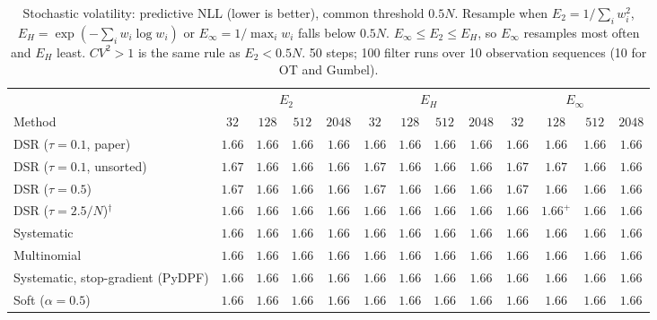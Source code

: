 \begin{table}[ht]
\centering
\small
\caption{Stochastic volatility: predictive NLL (lower is better), common threshold $0.5N$. Resample when $E_2=1/\sum_iw_i^2$, $E_H=\exp(-\sum_iw_i\log w_i)$ or $E_\infty=1/\max_iw_i$ falls below $0.5N$. $E_\infty\le E_2\le E_H$, so $E_\infty$ resamples most often and $E_H$ least. $CV^2>1$ is the same rule as $E_2<0.5N$. 50 steps; 100 filter runs over 10 observation sequences (10 for OT and Gumbel).}
\label{tab:trigger-fixed-volatility-predictive_nll}
\begin{adjustbox}{max width=\linewidth}
\begin{tabular}{lcccc|cccc|cccc}
\toprule
 & \multicolumn{4}{c}{$E_2$} & \multicolumn{4}{c}{$E_H$} & \multicolumn{4}{c}{$E_\infty$} \\
\cmidrule(lr){2-5} \cmidrule(lr){6-9} \cmidrule(lr){10-13}
Method & $32$ & $128$ & $512$ & $2048$ & $32$ & $128$ & $512$ & $2048$ & $32$ & $128$ & $512$ & $2048$ \\
\midrule
DSR ($\tau{=}0.1$, paper) & $1.66$ & $1.66$ & $1.66$ & $1.66$ & $1.66$ & $1.66$ & $1.66$ & $1.66$ & $\mathbf{1.66}$ & $\mathbf{1.66}$ & $\mathbf{1.66}$ & $\mathbf{1.66}$ \\
DSR ($\tau{=}0.1$, unsorted) & $\mathbf{1.67}$ & $1.66$ & $\mathbf{1.66}$ & $\mathbf{1.66}$ & $1.67$ & $\mathbf{1.66}$ & $1.66$ & $1.66$ & $1.67$ & $1.67$ & $1.66$ & $1.66$ \\
DSR ($\tau{=}0.5$) & $\mathbf{1.67}$ & $1.66$ & $\mathbf{1.66}$ & $\mathbf{1.66}$ & $1.67$ & $\mathbf{1.66}$ & $1.66$ & $1.66$ & $1.67$ & $1.66$ & $1.66$ & $1.66$ \\
DSR ($\tau{=}2.5/N$)$^\dagger$ & $1.66$ & $1.66$ & $\mathbf{1.66}$ & $1.66$ & $1.66$ & $1.66$ & $1.66$ & $1.66$ & $\mathbf{1.66}$ & $\mathbf{1.66}^{+}$ & $1.66$ & $\mathbf{1.66}$ \\
\midrule
Systematic & $1.66$ & $1.66$ & $\mathbf{1.66}$ & $1.66$ & $1.66$ & $\mathbf{1.66}$ & $1.66$ & $1.66$ & $\mathbf{1.66}$ & $1.66$ & $1.66$ & $\mathbf{1.66}$ \\
Multinomial & $1.66$ & $1.66$ & $1.66$ & $\mathbf{1.66}$ & $1.66$ & $\mathbf{1.66}$ & $\mathbf{1.66}$ & $1.66$ & $\mathbf{1.66}$ & $1.66$ & $1.66$ & $1.66$ \\
Systematic, stop-gradient (PyDPF) & $1.66$ & $1.66$ & $1.66$ & $1.66$ & $1.66$ & $\mathbf{1.66}$ & $\mathbf{1.66}$ & $1.66$ & $\mathbf{1.66}$ & $1.66$ & $1.66$ & $\mathbf{1.66}$ \\
Soft ($\alpha{=}0.5$) & $1.66$ & $1.66$ & $1.66$ & $\mathbf{1.66}$ & $\mathbf{1.66}$ & $1.66$ & $1.66$ & $1.66$ & $1.66$ & $\mathbf{1.66}$ & $\mathbf{1.66}$ & $1.66$ \\

\end{tabular}
\end{adjustbox}
\end{table}
